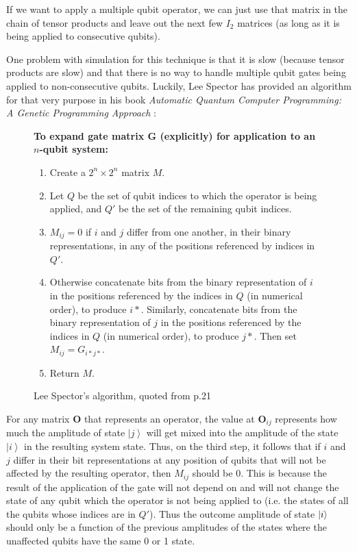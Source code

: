 \documentclass[11pt]{report}
\newcommand{\?}{\stackrel{?}{=}}
\begin{document}
If we want to apply a multiple qubit operator, we can just use that matrix in the chain of tensor products and leave out the next few $I_2$ matrices (as long as it is being applied to consecutive qubits). 

One problem with simulation for this technique is that it is slow (because tensor products are slow) and that there is no way to handle multiple qubit gates being applied to non-consecutive qubits. Luckily, Lee Spector has provided an algorithm for that very purpose in his book \textit{Automatic Quantum Computer Programming: A Genetic Programming Approach} \cite{spector04}:
\begin{figure}[H]
\begin{framed}
\textbf{To expand gate matrix G (explicitly) for application to an $n$-qubit system:}
\begin{enumerate}
\item Create a $2^{n} \times 2^{n}$ matrix $M$.
\item Let $Q$ be the set of qubit indices to which the operator is
being applied, and $Q'$ be the set of the remaining qubit
indices.
\item $M_{ij}=0$ if $i$ and $j$ differ from one another, in their binary representations, in any of the positions referenced by indices in $Q'$.
\item Otherwise concatenate bits from the binary representation of $i$ in the positions referenced by the indices in $Q$ (in numerical order), to produce $i*$. Similarly, concatenate bits from the binary representation of $j$ in the positions referenced by the indices in $Q$ (in numerical order), to
produce $j*$. Then set $M_{ij}=G_{i*j*}$.
\item Return $M$.
\end{enumerate}
\end{framed}
\caption{Lee Spector's algorithm, quoted from p.21}
\end{figure}

For any matrix $\mathbf{O}$ that represents an operator, the value at $\mathbf{O}_{ij}$ represents how much the amplitude of state $\left | j \right \rangle$ will get mixed into the amplitude of the state $\left | i \right \rangle$ in the resulting system state. Thus, on the third step, it follows that if $i$ and $j$ differ in their bit representations at any position of qubits that will not be affected by the resulting operator, then $M_{ij}$ should be 0. This is because the result of the application of the gate will not depend on and will not change the state of any qubit which the operator is not being applied to (i.e. the states of all the qubits whose indices are in $Q'$). Thus the outcome amplitude of state $\ket{i}$ should only be a function of the previous amplitudes of the states where the unaffected qubits have the same 0 or 1 state.
\end{document}
